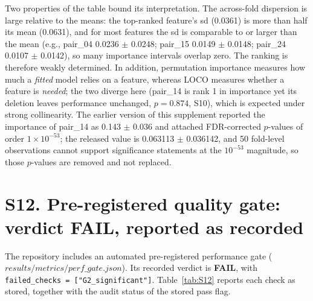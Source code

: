 \documentclass[utf8]{frontiers_suppmat}
\begin{document}
Two properties of the table bound its interpretation. The across-fold dispersion is large relative to the means: the top-ranked feature's sd (0.0361) is more than half its mean (0.0631), and for most features the sd is comparable to or larger than the mean (e.g., pair\_04 0.0236 $\pm$ 0.0248; pair\_15 0.0149 $\pm$ 0.0148; pair\_24 0.0107 $\pm$ 0.0142), so many importance intervals overlap zero. The ranking is therefore weakly determined. In addition, permutation importance measures how much a \emph{fitted} model relies on a feature, whereas LOCO measures whether a feature is \emph{needed}; the two diverge here (pair\_14 is rank 1 in importance yet its deletion leaves performance unchanged, $p = 0.874$, S10), which is expected under strong collinearity. The earlier version of this supplement reported the importance of pair\_14 as 0.143 $\pm$ 0.036 and attached FDR-corrected $p$-values of order $1 \times 10^{-53}$; the released value is 0.063113 $\pm$ 0.036142, and 50 fold-level observations cannot support significance statements at the $10^{-53}$ magnitude, so those $p$-values are removed and not replaced.

\section{S12. Pre-registered quality gate: verdict FAIL, reported as recorded}

The repository includes an automated pre-registered performance gate ($results/metrics/perf\_gate.json$). Its recorded verdict is \textbf{FAIL}, with \texttt{failed\_checks = ["G2\_significant"]}. Table~\ref{tab:S12} reports each check as stored, together with the audit status of the stored pass flag.
\end{document}
